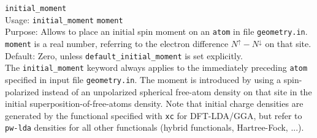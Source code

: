\documentclass[11pt,letterpaper]{article}
\begin{document}
\texttt{initial\_moment} \\[1.0ex]
{
  \noindent
  Usage: \texttt{initial\_moment} \texttt{moment} \\[1.0ex]
  Purpose: Allows to place an initial spin moment on an \texttt{atom} in
    file \texttt{geometry.in}. \\[1.0ex]
  \texttt{moment} is a real number, referring to the electron
  difference $N^\uparrow - N^\downarrow$ on that site. Default: Zero, 
  unless \texttt{default\_initial\_moment} is set explicitly. \\[1.0ex]
}
The \texttt{initial\_moment} keyword always applies to the immediately preceding
\texttt{atom} specified in input file
\texttt{geometry.in}. The moment is introduced by using a
spin-polarized instead of an unpolarized spherical free-atom density
on that site in the initial superposition-of-free-atoms density. Note
that initial charge densities are generated by the functional
  specified with \texttt{xc} 
for DFT-LDA/GGA, but refer to \texttt{pw-lda} densities for all other
functionals (hybrid functionals, Hartree-Fock, ...).
\end{document}
